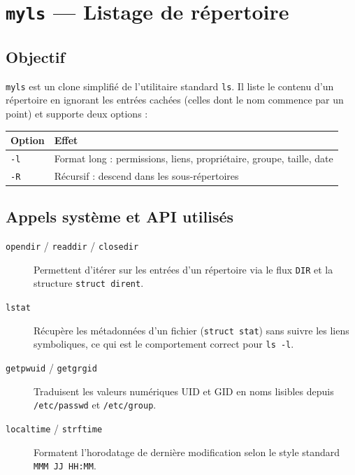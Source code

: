 \documentclass[12pt,a4paper]{article}
\begin{document}
\section{\texttt{myls} --- Listage de répertoire}

\subsection{Objectif}

\texttt{myls} est un clone simplifié de l'utilitaire standard \texttt{ls}.
Il liste le contenu d'un répertoire en ignorant les entrées cachées (celles
dont le nom commence par un point) et supporte deux options :

\begin{center}
\begin{tabular}{@{}ll@{}}
\toprule
Option & Effet \\
\midrule
\texttt{-l} & Format long : permissions, liens, propriétaire, groupe, taille, date \\
\texttt{-R} & Récursif : descend dans les sous-répertoires \\
\bottomrule
\end{tabular}
\end{center}

\subsection{Appels système et API utilisés}

\begin{description}
    \item[\texttt{opendir} / \texttt{readdir} / \texttt{closedir}]
        Permettent d'itérer sur les entrées d'un répertoire via le flux
        \texttt{DIR} et la structure \texttt{struct dirent}.
    \item[\texttt{lstat}]
        Récupère les métadonnées d'un fichier (\texttt{struct stat}) sans
        suivre les liens symboliques, ce qui est le comportement correct
        pour \texttt{ls -l}.
    \item[\texttt{getpwuid} / \texttt{getgrgid}]
        Traduisent les valeurs numériques UID et GID en noms lisibles
        depuis \texttt{/etc/passwd} et \texttt{/etc/group}.
    \item[\texttt{localtime} / \texttt{strftime}]
        Formatent l'horodatage de dernière modification selon le style
        standard \texttt{MMM JJ HH:MM}.
\end{description}
\end{document}
